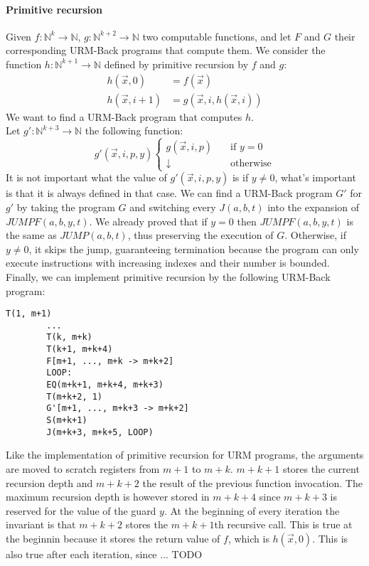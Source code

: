 \documentclass[a4paper, 12pt]{article}
\newcommand{\N}{\mathbb{N}}
\begin{document}
    \paragraph*{Primitive recursion} Given $f: \N^k \to \N$, $g: \N^{k+2} \to \N$ two computable functions, and let $F$ and $G$ their corresponding URM-Back programs that compute them. We consider the function $h: \N^{k+1} \to \N$ defined by primitive recursion by $f$ and $g$:
    \begin{align*}
        h(\vec{x}, 0) &= f(\vec{x}) \\
        h(\vec{x}, i + 1) &= g(\vec{x}, i, h(\vec{x}, i))
    \end{align*}
    We want to find a URM-Back program that computes $h$. \\[0.5em]
    Let $g': \N^{k+3} \to \N$ the following function:
    \[ g'(\vec{x}, i, p, y) \begin{cases}
        g(\vec{x}, i, p) &\quad\text{if } y = 0 \\
        \downarrow &\quad\text{otherwise}
    \end{cases} \]
    It is not important what the value of $g'(\vec{x}, i, p, y)$ is if $y \neq 0$, what's important is that it is always defined in that case.
    We can find a URM-Back program $G'$ for $g'$ by taking the program $G$ and switching every $J(a, b, t)$ into the expansion of $JUMPF(a, b, y, t)$. We already proved that if $y = 0$ then $JUMPF(a, b, y, t)$ is the same as $JUMP(a, b, t)$, thus preserving the execution of $G$. Otherwise, if $y \neq 0$, it skips the jump, guaranteeing termination because the program can only execute instructions with increasing indexes and their number is bounded. Finally, we can implement primitive recursion by the following URM-Back program:
    \begin{lstlisting}[language=URM]
        T(1, m+1)
        ...
        T(k, m+k)
        T(k+1, m+k+4)
        F[m+1, ..., m+k -> m+k+2]
        LOOP:
        EQ(m+k+1, m+k+4, m+k+3)
        T(m+k+2, 1)
        G'[m+1, ..., m+k+3 -> m+k+2]
        S(m+k+1)
        J(m+k+3, m+k+5, LOOP)
    \end{lstlisting}
    Like the implementation of primitive recursion for URM programs, the arguments are moved to scratch registers from $m+1$ to $m+k$. $m+k+1$ stores the current recursion depth and $m+k+2$ the result of the previous function invocation. The maximum recursion depth is however stored in $m+k+4$ since $m+k+3$ is reserved for the value of the guard $y$. At the beginning of every iteration the invariant is that $m+k+2$ stores the $m+k+1$th recursive call. This is true at the beginnin because it stores the return value of $f$, which is $h(\vec{x}, 0)$. This is also true after each iteration, since ... TODO
\end{document}
